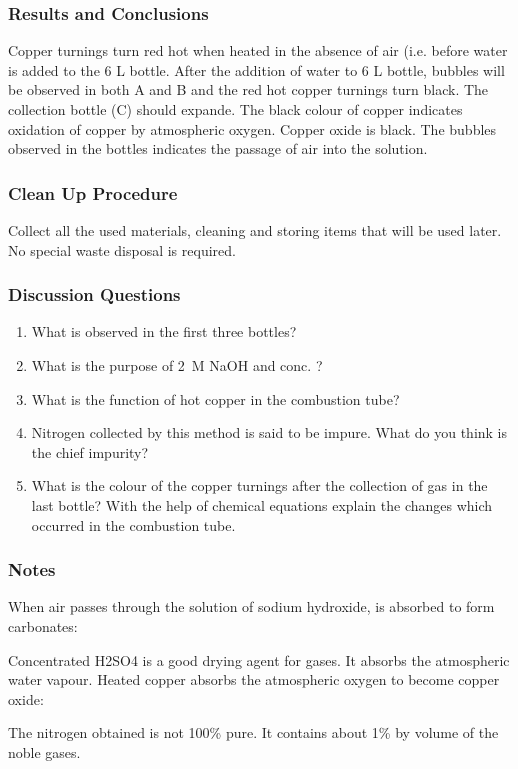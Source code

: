\subsubsection*{Results and Conclusions}
Copper turnings turn red hot when heated in the absence of air (i.e. before water is added to the 6 L bottle. After the addition of water to 6 L bottle, bubbles will be observed in both A and B and the red hot copper turnings turn black. The collection bottle (C) should expande. The black colour of copper indicates oxidation of copper by atmospheric oxygen. Copper oxide is black. The bubbles observed in the bottles indicates the passage of air into the solution.

\subsubsection*{Clean Up Procedure}
Collect all the used materials, cleaning and storing items that will be used later. No special waste disposal is required.

\subsubsection*{Discussion Questions}
\begin{enumerate}
\item{What is observed in the first three bottles?}
\item{What is the purpose of 2~M NaOH and conc. ?}
\item{What is the function of hot copper in the combustion tube?}
\item{Nitrogen collected by this method is said to be impure. What do you think is the chief impurity?}
\item{What is the colour of the copper turnings after the collection of gas in the last bottle? With the help of chemical equations explain the changes which occurred in the combustion tube.}
\end{enumerate}

\subsubsection*{Notes}
When air passes through the solution of sodium hydroxide,  is absorbed to form carbonates:
\begin{center}
\end{center}
Concentrated H2SO4 is a good drying agent for gases. It absorbs the atmospheric water vapour.
Heated copper absorbs the atmospheric oxygen to become copper oxide:
\begin{center}
\end{center}
The nitrogen obtained is not 100\% pure. It contains about 1\% by volume of the noble gases.

